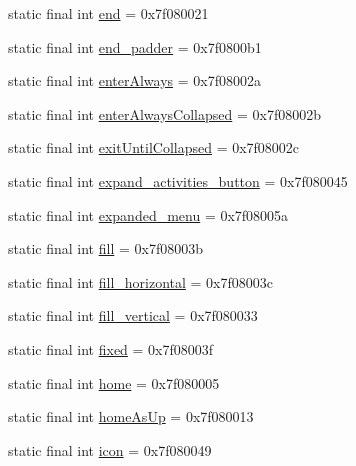 \begin{CompactItemize}
static final int \hyperlink{classandroid_1_1support_1_1mediacompat_1_1_r_1_1id_7c6a1c69988a3b265e9b5a0330e74a78}{end} = 0x7f080021
\item 
static final int \hyperlink{classandroid_1_1support_1_1mediacompat_1_1_r_1_1id_325d9359805748d2462bc28e8726a2f9}{end\_\-padder} = 0x7f0800b1
\item 
static final int \hyperlink{classandroid_1_1support_1_1mediacompat_1_1_r_1_1id_4fc69a9b149b2782e560b078e08f91ac}{enterAlways} = 0x7f08002a
\item 
static final int \hyperlink{classandroid_1_1support_1_1mediacompat_1_1_r_1_1id_32ca60c27986f319e4974a841d11bf10}{enterAlwaysCollapsed} = 0x7f08002b
\item 
static final int \hyperlink{classandroid_1_1support_1_1mediacompat_1_1_r_1_1id_801d99cd64df92b08fd07a47b55523bd}{exitUntilCollapsed} = 0x7f08002c
\item 
static final int \hyperlink{classandroid_1_1support_1_1mediacompat_1_1_r_1_1id_5663d02250477231adaf37d01d424e4c}{expand\_\-activities\_\-button} = 0x7f080045
\item 
static final int \hyperlink{classandroid_1_1support_1_1mediacompat_1_1_r_1_1id_6189e674e3de017a6c194141db888043}{expanded\_\-menu} = 0x7f08005a
\item 
static final int \hyperlink{classandroid_1_1support_1_1mediacompat_1_1_r_1_1id_115810444e7bca9f48026f13480ee6af}{fill} = 0x7f08003b
\item 
static final int \hyperlink{classandroid_1_1support_1_1mediacompat_1_1_r_1_1id_a49a0d924c3cb41670b27e7d022609ba}{fill\_\-horizontal} = 0x7f08003c
\item 
static final int \hyperlink{classandroid_1_1support_1_1mediacompat_1_1_r_1_1id_d5b2d217ef0b8ec0fb2cdd18e04b0976}{fill\_\-vertical} = 0x7f080033
\item 
static final int \hyperlink{classandroid_1_1support_1_1mediacompat_1_1_r_1_1id_eedaa412155688bed579b3f2d68a5fa0}{fixed} = 0x7f08003f
\item 
static final int \hyperlink{classandroid_1_1support_1_1mediacompat_1_1_r_1_1id_ef2f9bc2f821e2f070a58097e2463527}{home} = 0x7f080005
\item 
static final int \hyperlink{classandroid_1_1support_1_1mediacompat_1_1_r_1_1id_c2805f1616746ff301f7ff55ca5748b3}{homeAsUp} = 0x7f080013
\item 
static final int \hyperlink{classandroid_1_1support_1_1mediacompat_1_1_r_1_1id_3a932473fa447d72d5780851eef9f1a4}{icon} = 0x7f080049
\item 

\end{CompactItemize}
